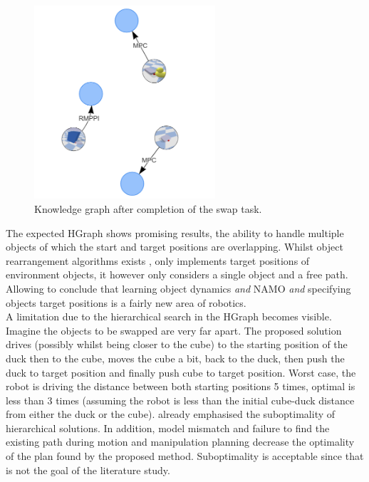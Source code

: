 \begin{figure}[H]
    \centering
    \includegraphics[width=0.6\textwidth]{figures/swap/swap_kgraph.png}
    \caption{Knowledge graph after completion of the swap task.}
    \label{figure: swap_kgraph}
\end{figure}

The expected HGraph shows promising results, the ability to handle multiple objects of which the start and target positions are overlapping. Whilst object rearrangement algorithms exists \cite{krontiris_dealing_2015}, only \cite{sabbagh_novin_model_2021} implements target positions of environment objects, it however only considers a single object and a free path. Allowing to conclude that learning object dynamics \textit{and} \ac{NAMO} \textit{and} specifying objects target positions is a fairly new area of robotics. \\

A limitation due to the hierarchical search in the HGraph becomes visible. Imagine the objects to be swapped are very far apart. The proposed solution drives (possibly whilst being closer to the cube) to the starting position of the duck then to the cube, moves the cube a bit, back to the duck, then push the duck to target position and finally push cube to target position. Worst case, the robot is driving the distance between both starting positions 5 times, optimal is less than 3 times (assuming the robot is less than the initial cube-duck distance from either the duck or the cube). \cite{goldberg_asymptotically_2020} already emphasised the suboptimality of hierarchical solutions. In addition, model mismatch and failure to find the existing path during motion and manipulation planning decrease the optimality of the plan found by the proposed method. Suboptimality is acceptable since that is not the goal of the literature study.





